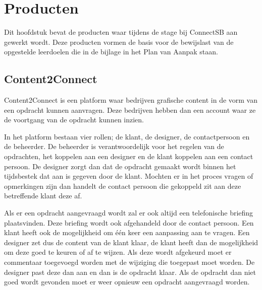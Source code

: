 \section{Producten}
Dit hoofdstuk bevat de producten waar tijdens de stage bij ConnectSB aan gewerkt wordt. Deze producten vormen de basis voor de bewijslast van de opgestelde leerdoelen die in de bijlage in het Plan van Aanpak staan.

\subsection{Content2Connect}
Content2Connect is een platform waar bedrijven grafische content in de vorm van een opdracht kunnen aanvragen. Deze bedrijven hebben dan een account waar ze de voortgang van de opdracht kunnen inzien.

In het platform bestaan vier rollen; de klant, de designer, de contactpersoon en de beheerder. De beheerder is verantwoordelijk voor het regelen van de opdrachten, het koppelen aan een designer en de klant koppelen aan een contact persoon. De designer zorgt dan dat de opdracht gemaakt wordt binnen het tijdsbestek dat aan is gegeven door de klant. Mochten er in het proces vragen of opmerkingen zijn dan handelt de contact persoon die gekoppeld zit aan deze betreffende klant deze af.

Als er een opdracht aangevraagd wordt zal er ook altijd een telefonische briefing plaatsvinden. Deze briefing wordt ook afgehandeld door de contact persoon. Een klant heeft ook de mogelijkheid om één keer een aanpassing aan te vragen. Een designer zet dus de content van de klant klaar, de klant heeft dan de mogelijkheid om deze goed te keuren of af te wijzen. Als deze wordt afgekeurd moet er commentaar toegevoegd worden met de wijziging die toegepast moet worden. De designer past deze dan aan en dan is de opdracht klaar. Als de opdracht dan niet goed wordt gevonden moet er weer opnieuw een opdracht aangevraagd worden.

\clearpage